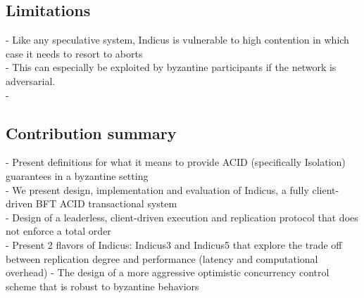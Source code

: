 \subsection{Limitations}
 - Like any speculative system, Indicus is vulnerable to high contention in which case it needs to resort to aborts\\
 - This can especially be exploited by byzantine participants if the network is adversarial.\\
 - 

\subsection{Contribution summary}
 - Present definitions for what it means to provide ACID (specifically Isolation) guarantees in a byzantine setting\\
 - We present design, implementation and evaluation of Indicus, a fully client-driven BFT ACID transactional system \\
 - Design of a leaderless, client-driven execution and replication protocol that does not enforce a total order\\
 - Present 2 flavors of Indicus: Indicus3 and Indicus5 that explore the trade off between replication degree and performance (latency and computational overhead)
 - The design of a more aggressive optimistic concurrency control scheme that is robust to byzantine behaviors